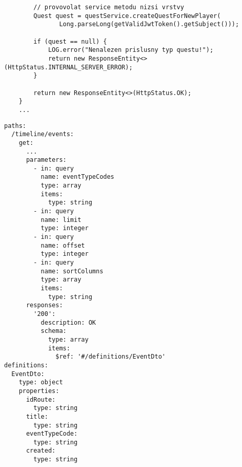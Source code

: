 \documentclass[twoside, 12pt]{article}
\begin{document}
{{\begin{lstlisting}
        // provovolat service metodu nizsi vrstvy
        Quest quest = questService.createQuestForNewPlayer(
               Long.parseLong(getValidJwtToken().getSubject()));

        if (quest == null) {
            LOG.error("Nenalezen prislusny typ questu!");
            return new ResponseEntity<>(HttpStatus.INTERNAL_SERVER_ERROR);
        }

        return new ResponseEntity<>(HttpStatus.OK);
    }
    ...

\end{lstlisting}

\clearpage


\vspace{10}



\vspace{10}


\vspace{10}




\begin{lstlisting}
paths:
  /timeline/events:
    get:
      ...
      parameters:
        - in: query
          name: eventTypeCodes
          type: array
          items:
            type: string
        - in: query
          name: limit
          type: integer
        - in: query
          name: offset
          type: integer
        - in: query
          name: sortColumns
          type: array
          items:
            type: string
      responses:
        '200':
          description: OK
          schema:
            type: array
            items:
              $ref: '#/definitions/EventDto'
definitions:
  EventDto:
    type: object
    properties:
      idRoute:
        type: string
      title:
        type: string
      eventTypeCode:
        type: string
      created:
        type: string
\end{lstlisting}

}}
\end{document}
